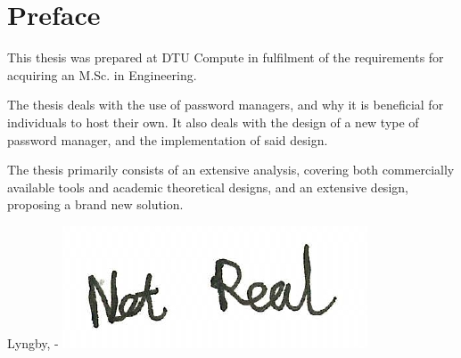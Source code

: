 \chapter{Preface}

This thesis was prepared at DTU Compute in fulfilment of the requirements for acquiring an M.Sc. in Engineering.

The thesis deals with the use of password managers, and why it is beneficial for individuals to host their own. It also deals with the design of a new type of password manager, and the implementation of said design.

The thesis primarily consists of an extensive analysis, covering both commercially available tools and academic theoretical designs, and an extensive design, proposing a brand new solution.
\vspace{20mm}
\begin{center}
    \hspace{20mm} Lyngby, \thesishandin-\thesisyear
    \vspace{5mm}
    \newline
    \includegraphics[scale=0.5]{figures/SignatureDummy}
\end{center}
\begin{flushright}
    \thesisauthor
\end{flushright}
